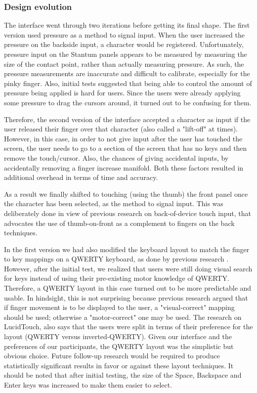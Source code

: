 \subsubsection{Design evolution}

The interface went through two iterations before getting its final shape. The first version used pressure as a method to signal input. When the user increased the pressure on the backside input, a character would be registered.  Unfortunately, pressure input on the Stantum panels appears to be measured by measuring the size of the contact point, rather than actually measuring pressure.  As such, the pressure measurements are inaccurate and difficult to calibrate, especially for the pinky finger. Also, initial tests suggested that being able to control the amount of pressure being applied is hard for users. Since the users were already applying some pressure to drag the cursors around, it turned out to be confusing for them.

Therefore, the second version of the interface accepted a character as input if the user released their finger over that character (also called a "lift-off" at times). However, in this case, in order to not give input after the user has touched the screen, the user needs to go to a section of the screen that has no keys and then remove the touch/cursor. Also, the chances of giving accidental inputs, by accidentally removing a finger increase manifold. Both these factors resulted in additional overhead in terms of time and accuracy.

As a result we finally shifted to touching (using the thumb) the front panel once the character has been selected, as the method to signal input. This was deliberately done in view of previous research on back-of-device touch input, that advocates the use of thumb-on-front as a complement to fingers on the back techniques.  

In the first version we had also modified the keyboard layout to match the finger to key mappings on a QWERTY keyboard, as done by previous research . However, after the initial test, we realized that users were still doing visual search for keys instead of using their pre-existing motor knowledge of QWERTY. Therefore, a QWERTY layout in this case turned out to be more predictable and usable. In hindsight, this is not surprising because previous research  argued that if finger movement is to be displayed to the user, a "visual-correct" mapping should be used; otherwise a "motor-correct" one may be used. The research on LucidTouch, also says that the users were split in terms of their preference for the layout (QWERTY versus inverted-QWERTY). Given our interface and the preferences of our participants, the QWERTY layout was the simplistic but obvious choice. Future follow-up research would be required to produce statistically significant results in favor or against these layout techniques. It should be noted that after initial testing, the size of the Space, Backspace and Enter keys was increased to make them easier to select.

